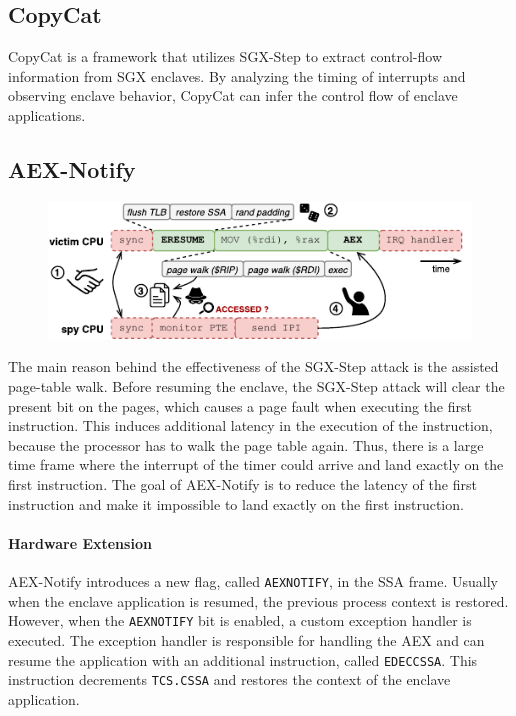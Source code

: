 \documentclass{llncs}
\begin{document}
\subsection{CopyCat}

CopyCat \cite{MoghimiBHPS20} is a framework that utilizes SGX-Step to extract control-flow information from SGX enclaves. By analyzing the timing of interrupts and observing enclave behavior, CopyCat can infer the control flow of enclave applications.


\subsection{AEX-Notify}

\begin{figure}[t]
  \centering
  \includegraphics{images/sgx-step-pte.pdf}
  \caption{}
  \label{fig:sgx-step-pte}
\end{figure}

The main reason behind the effectiveness of the SGX-Step attack is the assisted
page-table walk.
Before resuming the enclave, the SGX-Step attack will clear the present bit
on the pages, which causes a page fault when executing the first instruction.
This induces additional latency in the execution of the instruction, because
the processor has to walk the page table again.
Thus, there is a large time frame where the interrupt of the timer could
arrive and land exactly on the first instruction.
The goal of AEX-Notify \cite{ConstableBCXXAK23} is to reduce the latency of the
first instruction and make it impossible to land exactly on the first
instruction.

\paragraph{Hardware Extension}
AEX-Notify introduces a new flag, called \texttt{AEXNOTIFY}, in the SSA frame.
Usually when the enclave application is resumed, the previous process context
is restored.
However, when the \texttt{AEXNOTIFY} bit is enabled, a custom exception handler
is executed.
The exception handler is responsible for handling the AEX and can resume the
application with an additional instruction, called \texttt{EDECCSSA}.
This instruction decrements \texttt{TCS.CSSA} and restores the context of the
enclave application.
\end{document}
